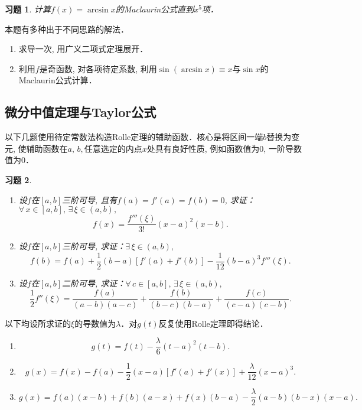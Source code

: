 \documentclass[11pt,a4paper]{ctexart}
\makeatletter
\theoremstyle{thmseries} %
\theoremstyle{exerseries}
\newtheorem{exer}{习题}[section]
\renewenvironment{proof}[1][\proofname]{\par
  \pushQED{\qed}%
  \normalfont \topsep6\p@\@plus6\p@\relax
  \trivlist
  \item[\hskip\labelsep
        \itshape
    #1\@addpunct{}]\ignorespaces
}{%
  \popQED\endtrivlist\@endpefalse
}
\newenvironment{sol}{\begin{proof}[\bfseries\upshape 解\quad]}{\end{proof}}
\newenvironment{pf}{\begin{proof}[\bfseries\upshape 证\quad]}{\end{proof}}
\newcommand{\sbra}[1]{\mathopen{}\left[#1\right]}
\makeatother
\begin{document}
\begin{exer}
	计算$f(x)=\arcsin x$的Maclaurin公式直到$x^5$项．
\end{exer}
\begin{sol}
	本题有多种出于不同思路的解法．
	\begin{enumerate}
		\item 求导一次, 用广义二项式定理展开．
		\item 利用$f$是奇函数, 对各项待定系数, 利用$\sin(\arcsin x)\equiv x$与$\sin x$的Maclaurin公式计算．
	\end{enumerate}
\end{sol}


\subsection{微分中值定理与Taylor公式}
以下几题使用待定常数法构造Rolle定理的辅助函数．核心是将区间一端$b$替换为变元, 使辅助函数在$a,\,b,$任意选定的内点$x$处具有良好性质, 例如函数值为0, 一阶导数值为0．
\begin{exer}
	\phantom{linebreak}
	\begin{enumerate}
		\item 设$f$在$[a,b]$三阶可导, 且有$f(a)=f'(a)=f(b)=0$, 求证：$\forall\,x\in[a,b],\,\exists\,\xi\in(a,b),$
		\[f(x)=\frac{f'''(\xi)}{3!}(x-a)^2(x-b).\]
		\item 设$f$在$[a,b]$三阶可导, 求证：$\exists\,\xi\in(a,b),$
		\[f(b)=f(a)+\frac{1}{2}(b-a)[f'(a)+f'(b)]-\frac{1}{12}(b-a)^3f'''(\xi).\]
		\item 设$f$在$[a,b]$二阶可导, 求证：$\forall\,c\in[a,b],\,\exists\,\xi\in(a,b),$
		\[\frac{1}{2}f''(\xi)=\frac{f(a)}{(a-b)(a-c)}+\frac{f(b)}{(b-c)(b-a)}+\frac{f(c)}{(c-a)(c-b)}.\]
	\end{enumerate}
\end{exer}
\begin{pf}
	以下均设所求证的$\xi$的导数值为$\lambda$．对$g(t)$反复使用Rolle定理即得结论．
	\begin{enumerate}
		\item \[g(t)=f(t)-\frac{\lambda}{6}(t-a)^2(t-b).\]
		\item \[g(x)=f(x)-f(a)-\frac{1}{2}(x-a)\sbra{f'(a)+f'(x)}+\frac{\lambda}{12}(x-a)^3.\]
		\item \[g(x)=f(a)(x-b)+f(b)(a-x)+f(x)(b-a)-\frac{\lambda}{2}(a-b)(b-x)(x-a).\]
	\end{enumerate}
\end{pf}
\end{document}
